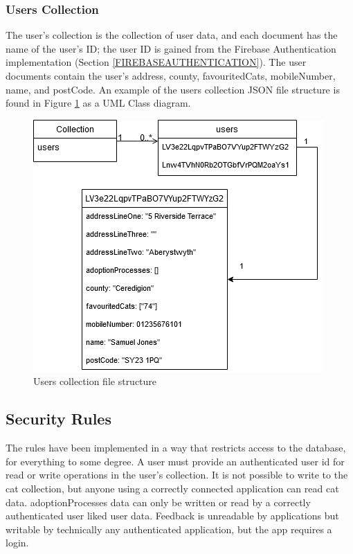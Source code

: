     \subsubsection{Users Collection} \label{USERSCOLLECTION}
    The user's collection is the collection of user data, and each document has the name of the user's ID; the user ID is gained from the Firebase Authentication implementation (Section \ref{FIREBASEAUTHENTICATION}). The user documents contain the user's address, county, favouritedCats, mobileNumber, name, and postCode. An example of the users collection JSON file structure is found in Figure \ref{fig:usersCollectionFileStructure} as a UML Class diagram.
    
 \begin{figure} [htbp!]
    \centering
    \includegraphics{Images/UserCollectionFileStructure.png}
    \caption{Users collection file structure}
    \label{fig:usersCollectionFileStructure}
\end{figure}   
    
    \subsection{Security Rules}
    The rules have been implemented in a way that restricts access to the database, for everything to some degree. A user must provide an authenticated user id for read or write operations in the user's collection. It is not possible to write to the cat collection, but anyone using a correctly connected application can read cat data. adoptionProcesses data can only be written or read by a correctly authenticated user liked user data. Feedback is unreadable by applications but writable by technically any authenticated application, but the app requires a login.
    
